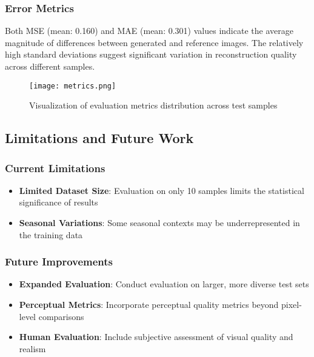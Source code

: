 \subsubsection{Error Metrics}
Both MSE (mean: 0.160) and MAE (mean: 0.301) values indicate the average magnitude of differences between generated and reference images. The relatively high standard deviations suggest significant variation in reconstruction quality across different samples.

\begin{figure}[h!]
    \centering
    \texttt{[image: metrics.png]}
    \caption{Visualization of evaluation metrics distribution across test samples}
    \label{fig:metrics}
\end{figure}

\subsection{Limitations and Future Work}

\subsubsection{Current Limitations}
\begin{itemize}
    \item \textbf{Limited Dataset Size}: Evaluation on only 10 samples limits the statistical significance of results
    \item \textbf{Seasonal Variations}: Some seasonal contexts may be underrepresented in the training data
\end{itemize}

\subsubsection{Future Improvements}
\begin{itemize}
    \item \textbf{Expanded Evaluation}: Conduct evaluation on larger, more diverse test sets
    \item \textbf{Perceptual Metrics}: Incorporate perceptual quality metrics beyond pixel-level comparisons
    \item \textbf{Human Evaluation}: Include subjective assessment of visual quality and realism
\end{itemize}